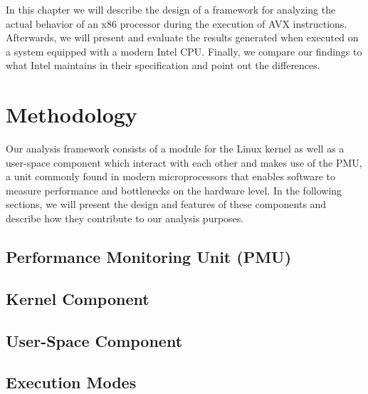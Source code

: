 In this chapter we will describe the design of a framework for analyzing the actual behavior of an x86 processor during the execution of \gls{AVX} instructions. Afterwards, we will present and evaluate the results generated when executed on a system equipped with a modern Intel \gls{CPU}. Finally, we compare our findings to what Intel maintains in their specification and point out the differences.

\section{Methodology}

Our analysis framework consists of a module for the Linux kernel as well as a user-space component which interact with each other and makes use of the \gls{PMU}, a unit commonly found in modern microprocessors that enables software to measure performance and bottlenecks on the hardware level. In the following sections, we will present the design and features of these components and describe how they contribute to our analysis purposes.

\subsection{Performance Monitoring Unit (PMU)}

\subsection{Kernel Component}

\subsection{User-Space Component}

\subsection{Execution Modes}